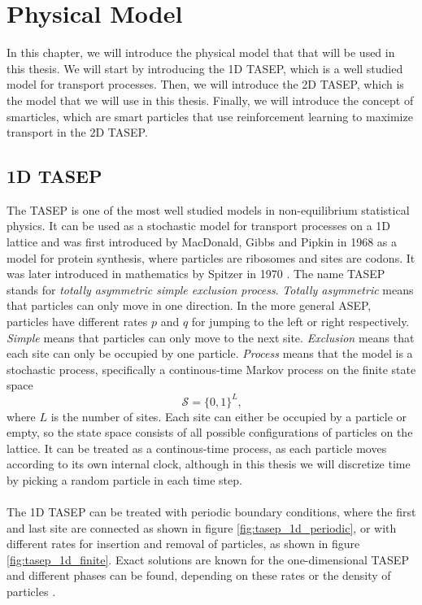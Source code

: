 \graphicspath{{img/model/out}{img/model}}

\chapter{Physical Model}
In this chapter, we will introduce the physical model that that will be used in this thesis. We will start by introducing the 1D TASEP, which is a well studied model for transport processes. Then, we will introduce the 2D TASEP, which is the model that we will use in this thesis. Finally, we will introduce the concept of smarticles, which are smart particles that use reinforcement learning to maximize transport in the 2D TASEP.

\section{1D TASEP}
\label{sec:1d-tasep}
The TASEP is one of the most well studied models in non-equilibrium statistical physics. It can be used as a stochastic model for transport processes on a 1D lattice and was first introduced by MacDonald, Gibbs and Pipkin in 1968 \cite{macdonald_kinetics_1968} as a model for protein synthesis, where particles are ribosomes and sites are codons. It was later introduced in mathematics by Spitzer in 1970 \cite{spitzer_interaction_1970}. The name TASEP stands for \textit{totally asymmetric simple exclusion process}. \textit{Totally asymmetric} means that particles can only move in one direction. In the more general ASEP, particles have different rates $p$ and $q$ for jumping to the left or right respectively. \textit{Simple} means that particles can only move to the next site. \textit{Exclusion} means that each site can only be occupied by one particle. \textit{Process} means that the model is a stochastic process, specifically a continous-time Markov process on the finite state space
\begin{equation}
    \mathcal{S} = \{0, 1\}^L \text{,}
    \label{eq:state-space}
\end{equation}
where $L$ is the number of sites. Each site can either be occupied by a particle or empty, so the state space consists of all possible configurations of particles on the lattice. It can be treated as a continous-time process, as each particle moves according to its own internal clock, although in this thesis we will discretize time by picking a random particle in each time step.
\\
\\
The 1D TASEP can be treated with periodic boundary conditions, where the first and last site are connected as shown in figure \ref{fig:tasep_1d_periodic}, or with different rates for insertion and removal of particles, as shown in figure \ref{fig:tasep_1d_finite}. Exact solutions are known for the one-dimensional TASEP and different phases can be found, depending on these rates or the density of particles \cite{schutz_exact_1997,blythe_nonequilibrium_2007}.

